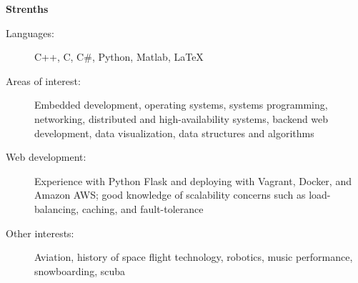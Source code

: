 \documentclass[letterpaper,11pt]{article}
\newcommand{\resheading}[1]{{\large \colorbox{mygrey}{\begin{minipage}{\textwidth}{\textbf{#1 \vphantom{p\^{E}}}}\end{minipage}}}}
\begin{document}
\resheading{Strenths}
	\begin{description}
		\item[Languages:] { \footnotesize C++, C, C\#, Python, Matlab, \LaTeX}
		\item[Areas of interest:] { \footnotesize Embedded development, operating systems, systems programming, networking, distributed and high-availability systems, backend web development, data visualization, data structures and algorithms}
		\item[Web development:]  { \footnotesize Experience with Python Flask and deploying with Vagrant, Docker, and Amazon AWS; good knowledge of scalability concerns such as load-balancing, caching, and fault-tolerance }
		\item[Other interests:] { \footnotesize Aviation, history of space flight technology, robotics, music performance, snowboarding, scuba }
	\end{description} %
	
\end{document}
